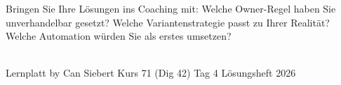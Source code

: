 \documentclass[11pt,a4paper,oneside]{article}
\begin{document}
\medskip
\begin{infobox}
Bringen Sie Ihre L\"osungen ins Coaching mit: Welche Owner-Regel haben Sie unverhandelbar gesetzt? Welche Variantenstrategie passt zu Ihrer Realit\"at? Welche Automation w\"urden Sie als erstes umsetzen?
\end{infobox}

\vspace{1cm}
\noindent{\color{lpAccent}\rule{\linewidth}{0.6pt}}\\[4pt]
{\footnotesize\sffamily\color{lpGray}Lernplatt \textperiodcentered{} by Can Siebert \textperiodcentered{} Kurs 71 (Dig 42) \textperiodcentered{} Tag 4 \textperiodcentered{} L\"osungsheft \textperiodcentered{} \textcopyright{} 2026}
\end{document}

